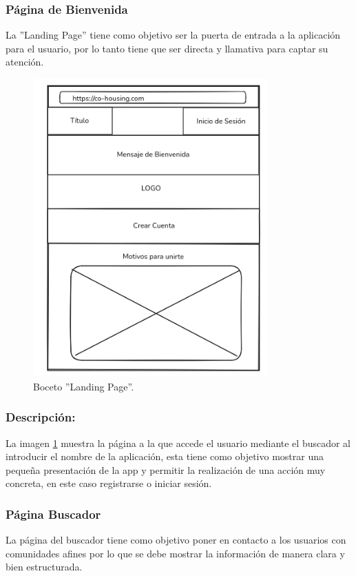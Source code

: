 \subsubsection*{Página de Bienvenida}
La ''Landing Page'' tiene como objetivo ser la puerta de entrada a la aplicación para el usuario, por lo tanto tiene que ser directa y llamativa para captar su atención.
\newpage
\begin{figure}[H]
    \centering
    \includegraphics[width=0.8\textwidth]{fotos/home-basico.png}
    \caption{Boceto ''Landing Page''\textbf{}.}
    \label{fig:landing-page}
\end{figure}
\subsubsection*{Descripción:}
La imagen \ref{fig:landing-page} muestra la página a la que accede el usuario mediante el buscador al introducir el nombre de la aplicación, esta tiene como objetivo mostrar una pequeña presentación de la app y permitir la realización de una acción muy concreta, en este caso registrarse o iniciar sesión.

\newpage

\subsubsection*{Página Buscador}
La página del buscador tiene como objetivo poner en contacto a los usuarios con comunidades afines por lo que se debe mostrar la información de manera clara y bien estructurada.

